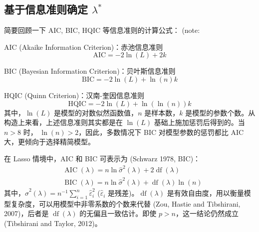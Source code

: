 

\subsection{基于信息准则确定 $\lambda^*$}\label{sec:lasso-lambda-ic}

简要回顾一下 AIC, BIC, HQIC 等信息准则的计算公式： (note: %

%
AIC (Akaike Information Criterion)：赤池信息准则
$$\mathrm{AIC} = -2 \ln(L) + 2 k$$

%
BIC (Bayesian Information Criterion)：贝叶斯信息准则
$$\mathrm{BIC}=-2 \ln(L) + \ln(n)k$$

%
HQIC (Quinn Criterion)：汉南-奎因信息准则
$$\mathrm{HQIC}=-2 \ln(L) + \ln(\ln(n))k$$
其中，$\ln(L)$ 是模型的对数似然函数值，$n$ 是样本数，$k$ 是模型的参数个数。从构造上来看，上述信息准则其实都是在 $\ln(L)$ 基础上施加惩罚后得到的。当 $n>8$ 时， $\ln(n)>2$，因此，多数情况下 BIC 对模型参数的惩罚都比 AIC 大，更倾向于选择精简模型。

在 Lasso 情境中，AIC 和 BIC 可表示为 (Schwarz 1978, BIC)：
%
\begin{equation}\label{eq:lasso-aic}
\begin{aligned}
&\operatorname{AIC}(\lambda)=n \ln \widehat{\sigma}^{2}(\lambda)+2 \operatorname{df}(\lambda) \\
&\operatorname{BIC}(\lambda)=n \ln \widehat{\sigma}^{2}(\lambda)+\operatorname{df}(\lambda) \ln (n)
\end{aligned}
\end{equation}
%
其中，$\widehat{\sigma}^{2}(\lambda)=n^{-1} \sum_{i=1}^{n} \widehat{\varepsilon}_{i}^{2}$ ($\widehat{\varepsilon}_{i}$ 是残差)。$\operatorname{df}(\lambda)$ 是有效自由度，用以衡量模型复杂度，可以用模型中非零系数的个数来代替 (Zou, Hastie and Tibshirani, 2007)，后者是 $\operatorname{df}(\lambda)$ 的无偏且一致估计。即使 $p>n$，这一结论仍然成立 (Tibshirani and Taylor, 2012)。


